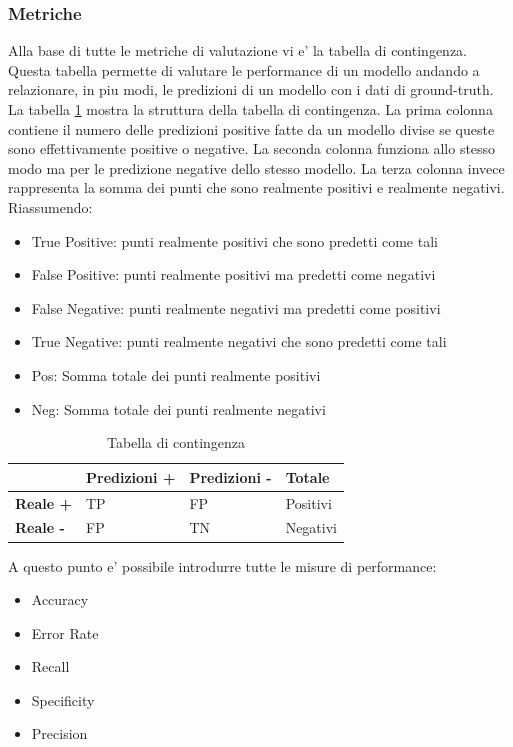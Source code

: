 \subsubsection{Metriche}
Alla base di tutte le metriche di valutazione vi e' la tabella di contingenza. Questa tabella permette di valutare le performance di un modello andando a relazionare, in piu modi, le predizioni di un modello con i dati di ground-truth.
La tabella \ref{contigency-table} mostra la struttura della tabella di contingenza.  La prima colonna contiene il numero delle predizioni positive fatte da un modello divise se queste sono effettivamente positive o negative. La seconda colonna funziona allo stesso modo ma per le predizione negative dello stesso modello. La terza colonna invece rappresenta la somma dei punti che sono realmente positivi e realmente negativi.
Riassumendo:
\begin{itemize}
\item True Positive: punti realmente positivi che sono predetti come tali
\item False Positive: punti realmente positivi ma predetti come negativi
\item False Negative: punti realmente negativi ma predetti come positivi
\item True Negative: punti realmente negativi che sono predetti come tali
\item Pos: Somma totale dei punti realmente positivi
\item Neg: Somma totale dei punti realmente negativi
\end{itemize}

\begin{table}[]
\centering
	\caption{\label{contigency-table}Tabella di contingenza}

\begin{tabular}{|l|l|l|l|}
\hline
                 & \textbf{Predizioni +} & \textbf{Predizioni -} & \textbf{Totale} \\ \hline
\textbf{Reale +} & TP                    & FP                    & Positivi        \\ \hline
\textbf{Reale -} & FP                    & TN                    & Negativi        \\ \hline
\end{tabular}
\end{table}

A questo punto e' possibile introdurre tutte le misure di performance:
\begin{itemize}
\item Accuracy
\item Error Rate
\item Recall
\item Specificity
\item Precision
\end{itemize}


